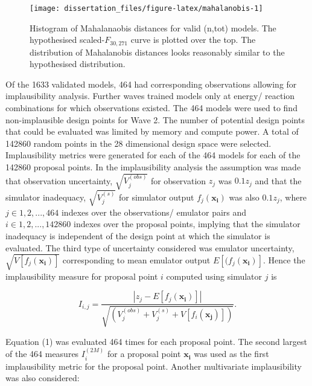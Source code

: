 \documentclass[
  12pt,
  a4paper,
  twoside]{book}
\begin{document}
\begin{figure}[H]

{\centering \texttt{[image: dissertation\_files/figure-latex/mahalanobis-1]} 

}

\caption{Histogram of Mahalanaobis distances for valid (n,tot) models. The hypothesised scaled-$F_{30,271}$ curve is plotted over the top. The distribution of Mahalanobis distances looks reasonably similar to the hypothesised distribution.}\label{fig:mahalanobis}
\end{figure}

Of the 1633 validated models, 464 had corresponding observations allowing for implausibility analysis. Further waves trained models only at energy/ reaction combinations for which observations existed. The 464 models were used to find non-implausible design points for Wave 2. The number of potential design points that could be evaluated was limited by memory and compute power. A total of 142860 random points in the 28 dimensional design space were selected. Implausibility metrics were generated for each of the 464 models for each of the 142860 proposal points. In the implausibility analysis the assumption was made that observation uncertainty, \(\sqrt{V_j^{(obs)}}\) for observation \(z_j\) was \(0.1z_j\) and that the simulator inadequacy, \(\sqrt{V^{(s)}_j}\) for simulator output \(f_j(\mathbf{x_i})\) was also \(0.1z_j\), where \(j \in 1,2,...,464\) indexes over the observations/ emulator pairs and \(i \in 1,2,...,142860\) indexes over the proposal points, implying that the simulator inadequacy is independent of the design point at which the simulator is evaluated. The third type of uncertainty considered was emulator uncertainty, \(\sqrt{V[f_j(\mathbf{x_i})]}\) corresponding to mean emulator output \(E[(f_j(\mathbf{x_i})]\). Hence the implausibility measure for proposal point \(i\) computed using simulator \(j\) is

\begin{equation}
\label{eq:implausibility}
I_{i,j} = \frac{ | z_j - E[f_j(\mathbf{x_i})]  |   }{ \sqrt{(V_j^{(obs)} + V^{(s)}_j + V[f_i(\mathbf{x_j})]   )   }}.
\end{equation}

Equation (1) was evaluated 464 times for each proposal point. The second largest of the 464 measures \(I_i^{(2M)}\) for a proposal point \(\mathbf{x_i}\) was used as the first implausibility metric for the proposal point. Another multivariate implausibility was also considered:
\end{document}
